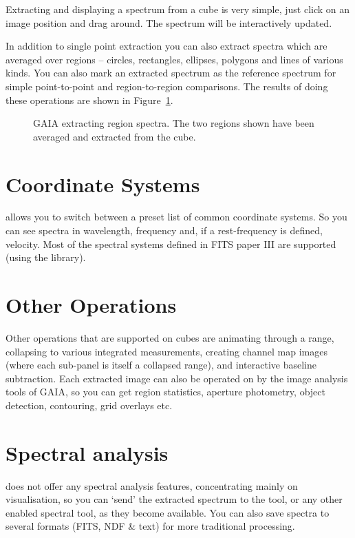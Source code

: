 \documentclass[11pt,twoside]{article}  %
\begin{document}
Extracting and displaying a spectrum from a cube is very simple, just click on
an image position and drag around. The spectrum will be interactively updated.

In addition to single point extraction you can also extract spectra which are
averaged over regions -- circles, rectangles, ellipses, polygons and lines of
various kinds. You can also mark an extracted spectrum as the reference
spectrum for simple point-to-point and region-to-region comparisons.
The results of doing these operations are shown in Figure~\ref{D1.1-fig2}.

\begin{figure}
\caption{GAIA extracting region spectra. The two regions shown have been
averaged and extracted from the cube.}
\label{D1.1-fig2}
\end{figure}


\section{Coordinate Systems}

allows you to switch between a preset list of common coordinate systems. So
you can see spectra in wavelength, frequency and, if a rest-frequency is
defined, velocity. Most of the spectral systems defined in FITS paper III are
supported (using the
 library).

\section{Other Operations}

Other operations that are supported on cubes are animating through a range,
collapsing to various integrated measurements, creating channel map images
(where each sub-panel is itself a collapsed range), and interactive baseline
subtraction. Each extracted image can also be operated on by the image
analysis tools of GAIA, so you can get region statistics, aperture photometry,
object detection, contouring, grid overlays etc.

\section{Spectral analysis}

does not offer any spectral analysis features, concentrating mainly on
visualisation, so you can `send' the extracted spectrum to the
tool, or any other
enabled spectral tool, as they become available. You can also save spectra to
several formats (FITS, NDF \& text) for more traditional processing.
\end{document}
